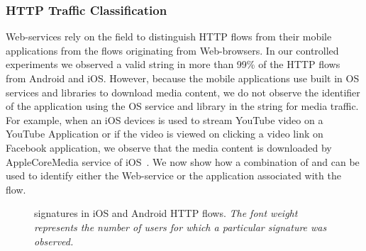 \subsubsection{HTTP Traffic Classification}

Web-services rely on the \useragent field to distinguish HTTP flows from their mobile applications from the flows originating from Web-browsers.
In our controlled experiments we observed a valid \useragent string in more than 99\% of the HTTP flows from Android and iOS.
However, because the mobile applications use built in OS services and libraries to download media content, we do not observe the identifier of the application using the OS service and library in the \useragent string for media traffic. 
For example, when an iOS devices is used to stream YouTube video on a YouTube Application or if the video is viewed on clicking a video link on Facebook application, we observe that the media content is downloaded by AppleCoreMedia service of iOS~\cite{apple:coremedia}. 
We now show how a combination of \useragent and \httphost can be used to identify either the Web-service or the application associated with the flow.

\begin{figure}
\newline
{}
\caption{\useragent signatures in  iOS and Android HTTP flows. \emph{The font weight represents the number of users for which a particular signature was observed.}}
\label{fig:http-wordcloud}
\end{figure}

